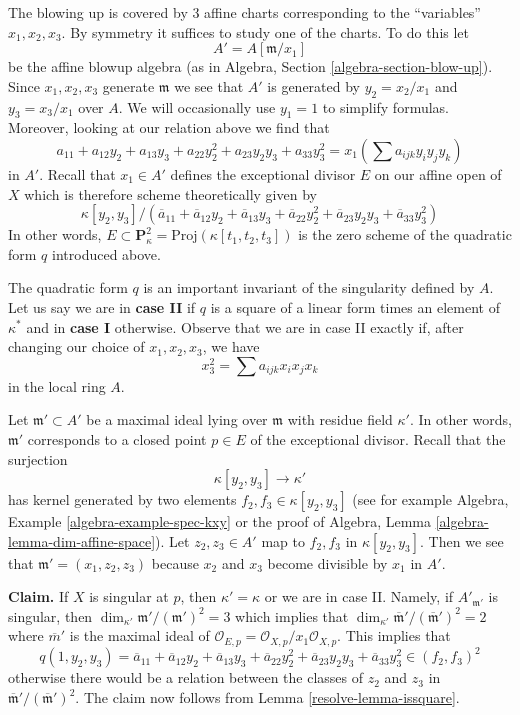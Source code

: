 \medskip\noindent
The blowing up is covered by $3$ affine charts corresponding to
the ``variables'' $x_1, x_2, x_3$. By symmetry it suffices to study
one of the charts. To do this let
$$
A' = A[\mathfrak m/x_1]
$$
be the affine blowup algebra (as in
Algebra, Section \ref{algebra-section-blow-up}).
Since $x_1, x_2, x_3$ generate $\mathfrak m$ we see that $A'$
is generated by $y_2 = x_2/x_1$ and $y_3 = x_3/x_1$ over $A$.
We will occasionally use $y_1 = 1$ to simplify formulas.
Moreover, looking at our relation above we find that
$$
a_{11} + a_{12} y_2 + a_{13} y_3 + a_{22} y_2^2 +
a_{23} y_2y_3 + a_{33} y_3^2 =
x_1 (\sum a_{ijk} y_iy_jy_k)
$$
in $A'$. Recall that $x_1 \in A'$ defines the exceptional divisor $E$
on our affine open of $X$
which is therefore scheme theoretically given by
$$
\kappa[y_2, y_3]/
(\overline{a}_{11} + \overline{a}_{12} y_2 + \overline{a}_{13} y_3 +
\overline{a}_{22} y_2^2 + \overline{a}_{23} y_2y_3 + \overline{a}_{33} y_3^2)
$$
In other words,
$E \subset \mathbf{P}^2_\kappa = \text{Proj}(\kappa[t_1, t_2, t_3])$ is
the zero scheme of the quadratic form $q$ introduced above.

\medskip\noindent
The quadratic form $q$ is an important invariant of the singularity
defined by $A$. Let us say we are in
{\bf case II} if $q$ is a square of a linear form times
an element of $\kappa^*$ and in {\bf case I} otherwise.
Observe that we are in case II exactly if, after
changing our choice of $x_1, x_2, x_3$, we have
$$
x_3^2 = \sum a_{ijk}x_ix_jx_k
$$
in the local ring $A$.

\medskip\noindent
Let $\mathfrak m' \subset A'$ be a maximal ideal lying over $\mathfrak m$
with residue field $\kappa'$. In other words, $\mathfrak m'$ corresponds
to a closed point $p \in E$ of the exceptional divisor. Recall that the
surjection
$$
\kappa[y_2, y_3] \to \kappa'
$$
has kernel generated by two elements $f_2, f_3 \in \kappa[y_2, y_3]$
(see for example Algebra, Example \ref{algebra-example-spec-kxy}
or the proof of
Algebra, Lemma \ref{algebra-lemma-dim-affine-space}).
Let $z_2, z_3 \in A'$ map to $f_2, f_3$ in $\kappa[y_2, y_3]$.
Then we see that $\mathfrak m' = (x_1, z_2, z_3)$ because
$x_2$ and $x_3$ become divisible by $x_1$ in $A'$.

\medskip\noindent
{\bf Claim.} If $X$ is singular at $p$, then $\kappa' = \kappa$ or we are
in case II. Namely, if $A'_{\mathfrak m'}$
is singular, then $\dim_{\kappa'} \mathfrak m'/(\mathfrak m')^2 = 3$
which implies that
$\dim_{\kappa'} \overline{\mathfrak m}'/(\overline{\mathfrak m}')^2 = 2$
where $\overline{m}'$ is the maximal ideal of
$\mathcal{O}_{E, p} = \mathcal{O}_{X, p}/x_1\mathcal{O}_{X, p}$.
This implies that
$$
q(1, y_2, y_3) =
\overline{a}_{11} + \overline{a}_{12} y_2 + \overline{a}_{13} y_3 +
\overline{a}_{22} y_2^2 + \overline{a}_{23} y_2y_3 + \overline{a}_{33} y_3^2
\in (f_2, f_3)^2
$$
otherwise there would be a relation between the classes of $z_2$
and $z_3$ in $\overline{\mathfrak m}'/(\overline{\mathfrak m}')^2$.
The claim now follows from Lemma \ref{resolve-lemma-issquare}.

